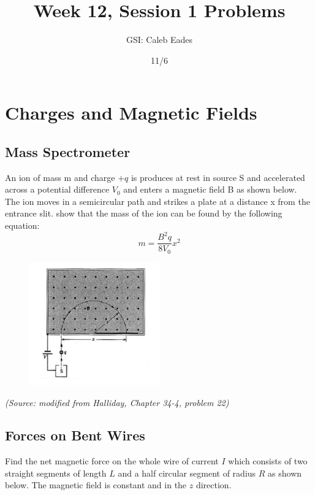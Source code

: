 \documentclass{article}
\begin{document}
\title{Week 12, Session 1 Problems}
\author{GSI: Caleb Eades}
\date{11/6}
\maketitle

\section{Charges and Magnetic Fields}

\subsection{Mass Spectrometer}

An ion of mass m and charge $+q$ is produces at rest in source S and accelerated across a potential difference $V_0$ and enters a magnetic field B as shown below. The ion moves in a semicircular path and strikes a plate at a distance x from the entrance slit. show that the mass of the ion can be found by the following equation:
\begin{equation}
m=\frac{B^2q}{8V_0}x^2
\end{equation}

\begin{figure}[h]
\begin{center}
	\includegraphics[width=0.5\textwidth]{Spectrometer.png}
\end{center}
\end{figure}

\textit{(Source: modified from Halliday, Chapter 34-4, problem 22)}

\subsection{Forces on Bent Wires}

Find the net magnetic force on the whole wire of current $I$ which consists of two straight segments of length $L$ and a half circular segment of radius $R$ as shown below. The magnetic field is constant and in the $\hat{z}$ direction.
\end{document}

